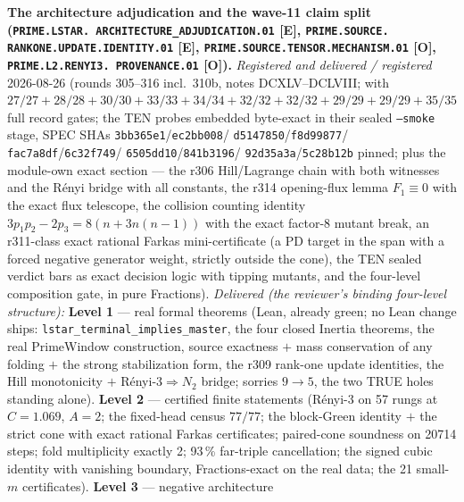 \documentclass[11pt,a4paper]{article}
\begin{document}
\par\smallskip\noindent\textbf{The architecture adjudication and
the wave-11 claim split (\texttt{PRIME.LSTAR.\allowbreak
ARCHITECTURE\_ADJUDICATION.01} [E], \texttt{PRIME.SOURCE.\allowbreak
RANKONE.\allowbreak UPDATE.\allowbreak IDENTITY.01} [E],
\texttt{PRIME.SOURCE.\allowbreak TENSOR.\allowbreak MECHANISM.01}
[O], \texttt{PRIME.L2.\allowbreak RENYI3.\allowbreak
PROVENANCE.01} [O]).}
{\sloppy
\emph{Registered and delivered / registered} 2026-08-26 (rounds
305--316 incl.\ 310b, notes DCXLV--DCLVIII;
 with $27/27 + 28/28 +
30/30 + 33/33 + 34/34 + 32/32 + 32/32 + 29/29 + 29/29 + 35/35$
full record gates; the TEN probes embedded byte-exact in their
sealed \texttt{--smoke} stage, SPEC SHAs
\texttt{3bb365e1}/\allowbreak\texttt{ec2bb008}/\allowbreak
\texttt{d5147850}/\allowbreak\texttt{f8d99877}/\allowbreak
\texttt{fac7a8df}/\allowbreak\texttt{6c32f749}/\allowbreak
\texttt{6505dd10}/\allowbreak\texttt{841b3196}/\allowbreak
\texttt{92d35a3a}/\allowbreak\texttt{5c28b12b} pinned; plus the
module-own exact section --- the
r306 Hill/Lagrange chain with both witnesses and the R\'enyi bridge
with all constants, the r314 opening-flux lemma $F_1 \equiv 0$ with
the exact flux telescope, the collision counting identity
$3p_1p_2 - 2p_3 = 8(n + 3n(n{-}1))$ with the exact factor-8 mutant
break, an r311-class exact rational Farkas mini-certificate (a PD
target in the span with a forced negative generator weight,
strictly outside the cone), the TEN sealed verdict bars as exact
decision logic with tipping mutants, and the four-level
composition gate, in pure Fractions).  \emph{Delivered (the
reviewer's binding four-level structure):} \textbf{Level 1} ---
real formal theorems (Lean, already green; no Lean change ships:
\texttt{lstar\_terminal\_implies\_master}, the four closed Inertia
theorems, the real PrimeWindow construction, source exactness $+$
mass conservation of any folding $+$ the strong stabilization
form, the r309 rank-one update identities, the Hill monotonicity
$+$ R\'enyi-3${}\Rightarrow N_2$ bridge; sorries $9 \to 5$, the
two TRUE holes standing alone).  \textbf{Level 2} --- certified
finite statements (R\'enyi-3 on 57 rungs at $C = 1.069$, $A = 2$;
the fixed-head census $77/77$; the block-Green identity $+$ the
strict cone with exact rational Farkas certificates; paired-cone
soundness on 20714 steps; fold multiplicity exactly 2; 93\,\%
far-triple cancellation; the signed cubic identity with vanishing
boundary, Fractions-exact on the real data; the 21 small-$m$
certificates).  \textbf{Level 3} --- negative architecture
}
\end{document}
